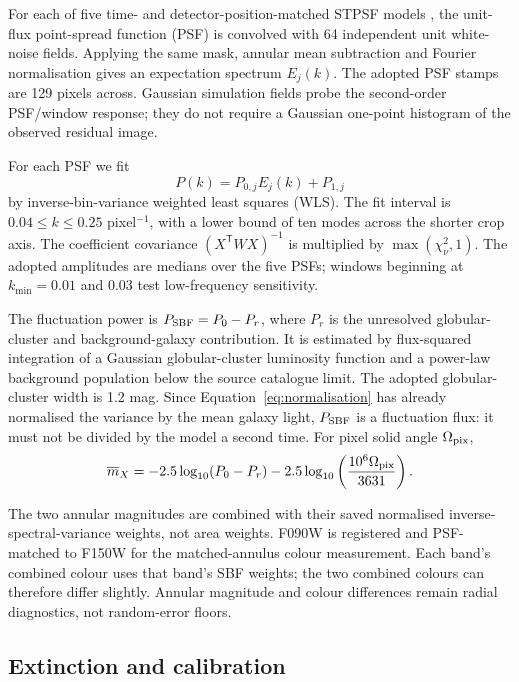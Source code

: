 \documentclass[nodoi,nocopyright]{pas}
\newcommand{\mbar}{\overline{m}}
\begin{document}
For each of five time- and detector-position-matched STPSF models
\citep{Perrin2014}, the unit-flux point-spread function (PSF) is convolved with 64 independent
unit white-noise fields. Applying the same mask, annular mean subtraction
and Fourier normalisation gives an expectation spectrum $E_j(k)$.
The adopted PSF stamps are 129 pixels across. Gaussian simulation fields
probe the second-order PSF/window response; they do not require a Gaussian
one-point histogram of the observed residual image.

For each PSF we fit
\begin{equation}
 P(k)=P_{0,j}E_j(k)+P_{1,j}
 \label{eq:power-model}
\end{equation}
by inverse-bin-variance weighted least squares (WLS). The fit interval is
$0.04\leq k\leq0.25$ pixel$^{-1}$, with a lower bound of ten modes across
the shorter crop axis. The coefficient covariance
$(X^{\mathsf T}WX)^{-1}$ is multiplied by $\max(\chi^2_\nu,1)$.
The adopted amplitudes are medians over the five PSFs; windows beginning
at $k_{\min}=0.01$ and 0.03 test low-frequency sensitivity.

The fluctuation power is $P_{\rm SBF}=P_0-P_r$, where $P_r$ is the
unresolved globular-cluster and background-galaxy contribution. It is
estimated by flux-squared integration of a Gaussian globular-cluster
luminosity function and a power-law background population below the source
catalogue limit. The adopted globular-cluster width is 1.2 mag.
Since Equation~\ref{eq:normalisation} has already normalised the variance
by the mean galaxy light, $P_{\rm SBF}$ is a fluctuation flux: it must not
be divided by the model a second time. For pixel solid angle
$\Omega_{\rm pix}$,
\begin{equation}
 \mbar_X=-2.5\log_{10}(P_0-P_r)
 -2.5\log_{10}\left(\frac{10^6\Omega_{\rm pix}}{3631}\right).
 \label{eq:mbar}
\end{equation}

The two annular magnitudes are combined with their saved normalised
inverse-spectral-variance weights, not area weights. F090W is registered
and PSF-matched to F150W for the matched-annulus colour measurement.
Each band's combined colour uses that band's SBF weights; the two combined
colours can therefore differ slightly. Annular magnitude and colour
differences remain radial diagnostics, not random-error floors.

\subsection{Extinction and calibration}
\label{sec:calibration-method}
\end{document}
